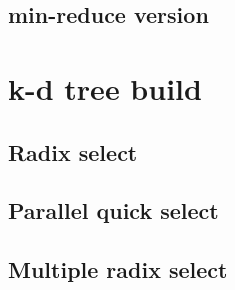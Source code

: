 


\subsection{min-reduce version} %
\label{sub:min_reduce}






\section{k-d tree build} %
\label{sec:k_d_tree_build}



\subsection{Radix select} %
\label{sec:radix_select}




 \subsection{Parallel quick select} %
 \label{sec:parallel_quick_select}





\subsection{Multiple radix select} %
\label{sec:multiple_radix_select}

